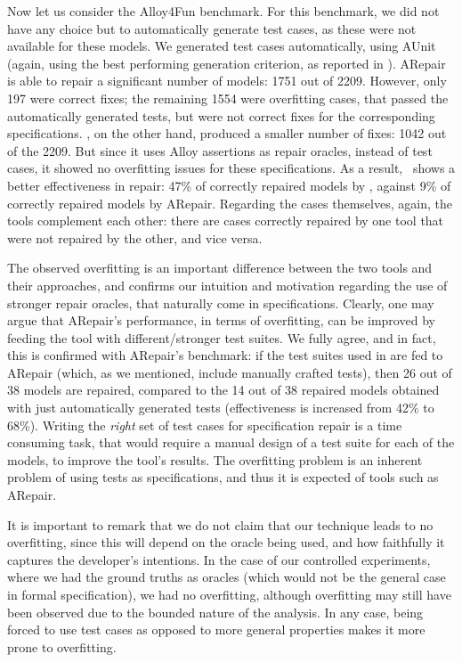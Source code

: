 Now let us consider the Alloy4Fun benchmark. For this benchmark, we did not have any choice but to automatically generate test cases, as these were not available for these models. We generated test cases automatically, using AUnit \cite{Sullivan+2018} (again, using the best performing generation criterion, as reported in \cite{Sullivan+2018}). ARepair is able to repair a significant number of models: 1751 out of 2209. However, only 197 were correct fixes; the remaining 1554 were overfitting cases, that passed the automatically generated tests, but were not correct fixes for the corresponding specifications. \technique, on the other hand, produced a smaller number of fixes: 1042 out of the 2209. But since it uses Alloy assertions as repair oracles, instead of test cases, it showed no overfitting issues for these specifications. As a result, \technique\ shows a better effectiveness in repair: 47\% of correctly repaired models by \technique, against 9\% of correctly repaired models by ARepair. Regarding the cases themselves, again, the tools complement each other: there are cases correctly repaired by one tool that were not repaired by the other, and vice versa. 

The observed overfitting is an important difference between the two tools and their approaches, and confirms our intuition and motivation regarding the use of stronger repair oracles, that naturally come in specifications. Clearly, one may argue that ARepair's performance, in terms of overfitting, can be improved by feeding the tool with different/stronger test suites. We fully agree, and in fact, this is confirmed with ARepair's benchmark: if the test suites used in \cite{Wang+2018} are fed to ARepair (which, as we mentioned, include manually crafted tests), then 26 out of 38 models are repaired, compared to the 14 out of 38 repaired models obtained with just automatically generated tests (effectiveness is increased from 42\% to 68\%). Writing the \emph{right} set of test cases for specification repair is a time consuming task, that would require a manual design of a test suite for each of the models, to improve the tool's results. The overfitting problem is an inherent problem of using tests as specifications, and thus it is expected of tools such as ARepair. 

It is important to remark that we do not claim that our technique leads to no overfitting, since this will depend on the oracle being used, and how faithfully it captures the developer's intentions. In the case of our controlled experiments, where we had the ground truths as oracles (which would not be the general case in formal specification), we had no overfitting, although overfitting may still have been observed due to the bounded nature of the analysis. In any case, being forced to use test cases as opposed to more general properties makes it more prone to overfitting. %

